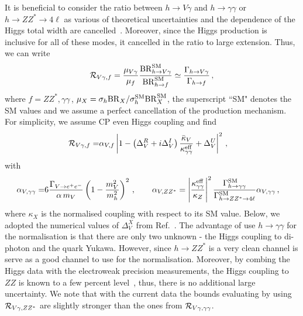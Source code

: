\documentclass[../report.tex]{subfiles}
\begin{document}
It is beneficial to consider the ratio between $h\to V\gamma$ and $h\to\gamma\gamma$ or $h\to ZZ^*\to4\ell$ as various of theoretical uncertainties and the dependence of the Higgs total width are cancelled~\cite{Perez:2015aoa,Koenig:2015pha}. Moreover, since the Higgs production is inclusive for all of these modes, it cancelled in the ratio to large extension. Thus, we can write 
% 
\begin{align}
	\mathcal{R}_{V\gamma,f} 
=	\frac{\mu_{V\gamma} }{\mu_{f}}  \frac{ {\rm BR}^{\rm SM}_{h\to V\gamma}}{ {\rm BR}^{\rm SM}_{h\to f}}  
	\simeq  
	\frac{\Gamma_{h\to V\gamma}}{ \Gamma_{h\to f}}  \, ,
\end{align}
%
where $f=ZZ^*, \gamma\gamma\,$, $\mu_X = \sigma_h {\rm BR}_{X}/\sigma^{\rm SM}_h {\rm BR}^{\rm SM}_{X}$, the superscript ``SM" denotes the SM values and we assume a perfect cancellation of the production mechanism. 
For simplicity, we assume CP even Higgs coupling and find 
%
\begin{align}
	\mathcal{R}_{V\gamma,f} 
=& 	\alpha_{V,f} \left\lvert1 - \left(\Delta^R_V+ i \Delta^I_V \right)\frac{\bar{\kappa}_V}{\kappa^{\rm eff}_{\gamma\gamma}} + \Delta^U_V\right\rvert^2  \, , 	
\end{align}
%
with
%
\begin{align}	
	\alpha_{V,\gamma\gamma}
=&	6\frac{\Gamma_{V\to e^+e^-}}{\alpha \, m_V} \left( 1 - \frac{m^2_V}{m^2_h} \right)^2 \, , \quad\quad
%
	\alpha_{V,ZZ^*}
= \abs{\frac{\kappa^{\rm eff}_{\gamma\gamma}}{\kappa_{Z}}}^2  \frac{\Gamma^{\rm SM}_{h\to\gamma\gamma}}{\Gamma^{\rm SM}_{h\to ZZ^*\to 4\ell}}\alpha_{V,\gamma\gamma} \, ,
\end{align}
%
where $\kappa_X$ is the normalised coupling with respect to its SM value. Below, we adopted the numerical values of $\Delta^X_V$ from Ref.~\cite{Koenig:2015pha}.
The advantage of use $h\to\gamma\gamma$ for the normalisation is that there are only two unknown - the Higgs coupling to di-photon and the quark Yukawa. 
However, since $h\to ZZ^*$ is a very clean channel is serve as a good channel to use for the normalisation. 
Moreover, by combing the Higgs data with the electroweak precision measurements, the Higgs coupling to $ZZ$ is known to a few percent level~\cite{Falkowski:2013dza,deBlas:2016ojx}, thus, there is no additional large uncertainty.  
We note that with the current data the bounds evaluating by using $\mathcal{R}_{V\gamma,ZZ^*}$ are slightly stronger than the ones from $\mathcal{R}_{V\gamma,\gamma\gamma}$. 
\end{document}
